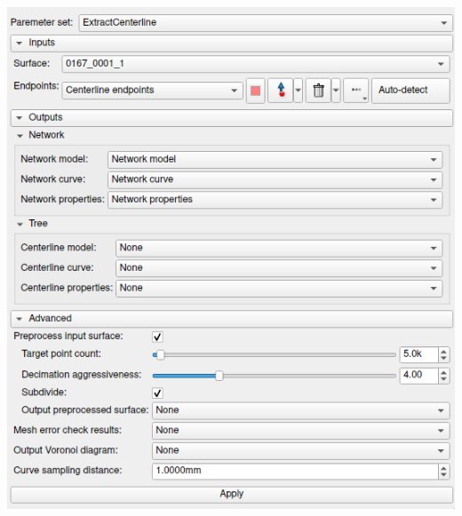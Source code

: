 \documentclass[compress]{beamer}
\begin{document}
\begin{frame}[label=1dge]
\begin{minipage}{\linewidth}
{\begin{minipage}{0.25\linewidth}
					\includegraphics[width=\linewidth]{images/0053_extract2.png}
			\end{minipage}}
\end{minipage}
\end{frame}
\end{document}
